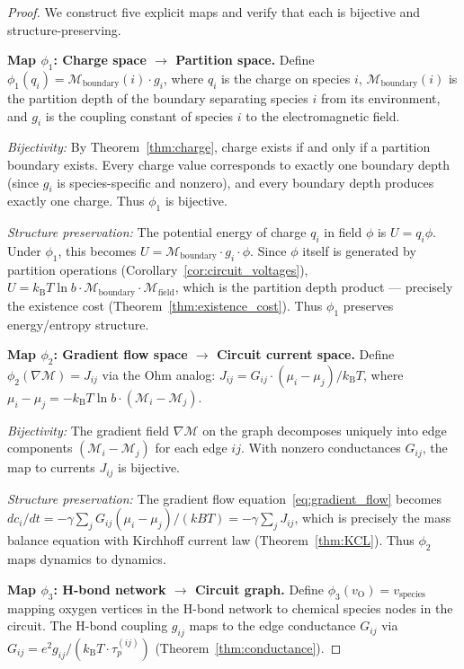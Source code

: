 \documentclass[twocolumn,10pt,a4paper]{article}
\theoremstyle{definition}
\theoremstyle{remark}
\newcommand{\kB}{k_{\mathrm{B}}}
\newcommand{\Depth}{\mathcal{M}}
\newcommand{\taup}{\tau_p}
\begin{document}
\begin{proof}
We construct five explicit maps and verify that each is bijective and structure-preserving.

\textbf{Map $\phi_1$: Charge space $\to$ Partition space.}
Define $\phi_1(q_i) = \Depth_{\mathrm{boundary}}(i) \cdot g_i$, where $q_i$ is the charge on species $i$, $\Depth_{\mathrm{boundary}}(i)$ is the partition depth of the boundary separating species $i$ from its environment, and $g_i$ is the coupling constant of species $i$ to the electromagnetic field.

\emph{Bijectivity:} By Theorem~\ref{thm:charge}, charge exists if and only if a partition boundary exists. Every charge value corresponds to exactly one boundary depth (since $g_i$ is species-specific and nonzero), and every boundary depth produces exactly one charge. Thus $\phi_1$ is bijective.

\emph{Structure preservation:} The potential energy of charge $q_i$ in field $\phi$ is $U = q_i \phi$. Under $\phi_1$, this becomes $U = \Depth_{\mathrm{boundary}} \cdot g_i \cdot \phi$. Since $\phi$ itself is generated by partition operations (Corollary~\ref{cor:circuit_voltages}), $U = \kB T \ln b \cdot \Depth_{\mathrm{boundary}} \cdot \Depth_{\mathrm{field}}$, which is the partition depth product --- precisely the existence cost (Theorem~\ref{thm:existence_cost}). Thus $\phi_1$ preserves energy/entropy structure.

\textbf{Map $\phi_2$: Gradient flow space $\to$ Circuit current space.}
Define $\phi_2(\nabla \Depth) = J_{ij}$ via the Ohm analog: $J_{ij} = G_{ij} \cdot (\mu_i - \mu_j) / \kB T$, where $\mu_i - \mu_j = -\kB T \ln b \cdot (\Depth_i - \Depth_j)$.

\emph{Bijectivity:} The gradient field $\nabla \Depth$ on the graph decomposes uniquely into edge components $(\Depth_i - \Depth_j)$ for each edge $ij$. With nonzero conductances $G_{ij}$, the map to currents $J_{ij}$ is bijective.

\emph{Structure preservation:} The gradient flow equation~\eqref{eq:gradient_flow} becomes $dc_i/dt = -\gamma \sum_j G_{ij}(\mu_i - \mu_j)/(kBT) = -\gamma \sum_j J_{ij}$, which is precisely the mass balance equation with Kirchhoff current law (Theorem~\ref{thm:KCL}). Thus $\phi_2$ maps dynamics to dynamics.

\textbf{Map $\phi_3$: H-bond network $\to$ Circuit graph.}
Define $\phi_3(v_{\mathrm{O}}) = v_{\mathrm{species}}$ mapping oxygen vertices in the H-bond network to chemical species nodes in the circuit. The H-bond coupling $g_{ij}$ maps to the edge conductance $G_{ij}$ via $G_{ij} = e^2 g_{ij} / (\kB T \cdot \taup^{(ij)})$ (Theorem~\ref{thm:conductance}).


\end{proof}
\end{document}
